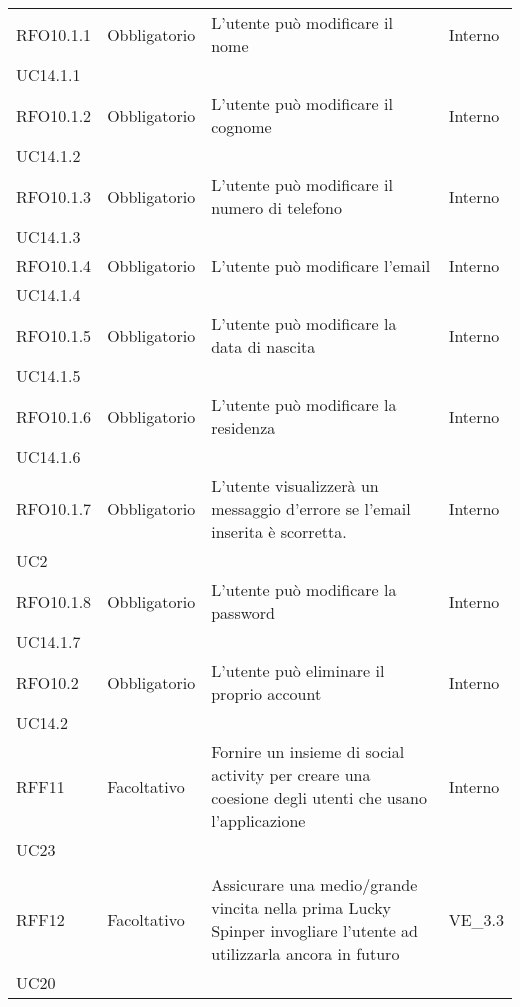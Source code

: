 \begin{longtable}{ >{\centering}p{} >{\centering}p{}
		>{\raggedright}p{} >{\centering}p{}}
	RFO10.1.1	&	Obbligatorio	&	L'utente può modificare il nome	&	Interno \\ UC14.1.1	\tabularnewline
	RFO10.1.2	&	Obbligatorio	&	L'utente può modificare il cognome	&	Interno \\ UC14.1.2	\tabularnewline
	RFO10.1.3	&	Obbligatorio	&	L'utente può modificare il numero di telefono 	&	Interno \\ UC14.1.3	\tabularnewline
	RFO10.1.4	&	Obbligatorio	&	L'utente può modificare l'email	&	Interno \\ UC14.1.4	\tabularnewline
	RFO10.1.5	&	Obbligatorio	&	L'utente può modificare la data di nascita	&	Interno \\ UC14.1.5	\tabularnewline
	RFO10.1.6	&	Obbligatorio	&	L'utente può modificare la residenza	&	Interno  \\ UC14.1.6	\tabularnewline
	RFO10.1.7	&	Obbligatorio	&	L'utente visualizzerà un messaggio d'errore se l'email inserita è scorretta.	&	Interno \\ UC2	\tabularnewline
	RFO10.1.8	&	Obbligatorio	&	L'utente può modificare la password	&	Interno  \\ UC14.1.7	\tabularnewline
	RFO10.2	&	Obbligatorio	&	L'utente può eliminare il proprio account	&	Interno  \\ UC14.2	\tabularnewline
	RFF11	&	Facoltativo	&	Fornire un insieme di social activity per creare una coesione degli utenti che usano l'applicazione &	Interno\\
	UC23\\ 	\tabularnewline
	RFF12	&	Facoltativo	& Assicurare una medio/grande vincita nella prima Lucky Spin\glosp per invogliare l'utente ad utilizzarla ancora in futuro &	VE\_3.3\\
	UC20   	\tabularnewline

\end{longtable}

